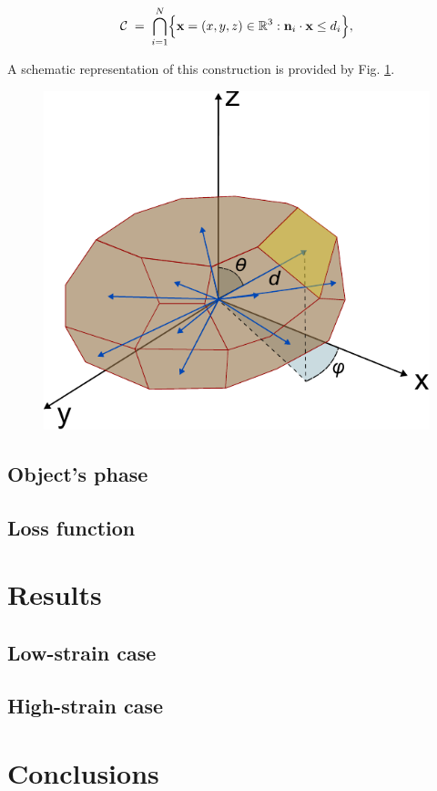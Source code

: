     \begin{equation}
    \mathcal C \;=\;
    \bigcap_{i=1}^N
    \Bigl\{\mathbf x=(x,y,z)\in\mathbb R^3 : 
    \mathbf n_i\cdot\mathbf x \le d_i\Bigr\},
    \label{eq:convex_hull}
    \end{equation}
    

 A schematic representation of this construction is provided by Fig. \ref{fig:support_construction}.

\begin{figure}[H]
    \centering
    \includegraphics[width=.8\textwidth]{figures/AD/AD.pdf}
    \caption{ }
    \label{fig:support_construction}
\end{figure}


\subsection{Object's phase}

\subsection{Loss function}

\section{Results}
\subsection{Low-strain case}
\subsection{High-strain case}
\section{Conclusions}
